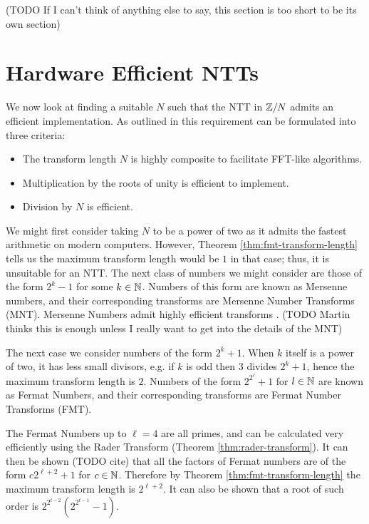 (TODO If I can't think of anything else to say, this section is too short to be its own section)

\section{Hardware Efficient NTTs}%
\label{sec:hardware-efficient-ntt}

We now look at finding a suitable $N$ such that the NTT in ${\mathbb Z} / N$ admits an efficient implementation. As outlined in \cite{intro-to-fmt} this requirement can be formulated into three criteria:
\begin{itemize}
    \item The transform length $N$ is highly composite to facilitate FFT-like algorithms.
    \item Multiplication by the roots of unity is efficient to implement.
    \item Division by $N$ is efficient.
\end{itemize}

We might first consider taking $N$ to be a power of two as it admits the fastest arithmetic on modern computers. However, Theorem \ref{thm:fmt-transform-length} tells us the maximum transform length would be $1$ in that case; thus, it is unsuitable for an NTT. The next class of numbers we might consider are those of the form $2^k - 1$ for some $k \in {\mathbb N}$. Numbers of this form are known as Mersenne numbers, and their corresponding transforms are Mersenne Number Transforms (MNT). Mersenne Numbers admit highly efficient transforms \cite{mersenne}. (TODO Martin thinks this is enough unless I really want to get into the details of the MNT)

The next case we consider numbers of the form $2^k + 1$. When $k$ itself is a power of two, it has less small divisors, e.g. if $k$ is odd then $3$ divides $2^k + 1$, hence the maximum transform length is $2$. Numbers of the form $2^{2^\ell} + 1$ for $l \in {\mathbb N}$ are known as Fermat Numbers, and their corresponding transforms are Fermat Number Transforms (FMT).

The Fermat Numbers up to $\ell = 4$ are all primes, and can be calculated very efficiently using the Rader Transform (Theorem \ref{thm:rader-transform}). It can then be shown (TODO cite) that all the factors of Fermat numbers are of the form $c2^{\ell + 2} + 1$ for $c \in {\mathbb N}$. Therefore by Theorem \ref{thm:fmt-transform-length} the maximum transform length is $2^{\ell + 2}$. It can also be shown that a root of such order is $2^{2^{t-2}}(2^{2^{t-1}} - 1)$. 

